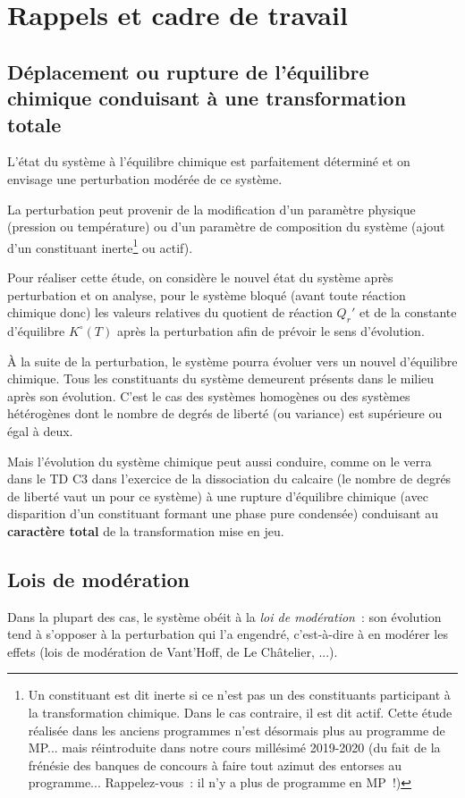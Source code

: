 \documentclass{article}
\begin{document}
\section{Rappels et cadre de travail}
\subsection{Déplacement ou rupture de l’équilibre chimique conduisant à une transformation totale}
L’état du système à l’équilibre chimique est parfaitement déterminé et on envisage une perturbation modérée de ce système.

La perturbation peut provenir de la modification d’un paramètre physique (pression ou température) ou d’un paramètre de composition du système (ajout d’un constituant inerte\footnote{Un constituant est dit inerte si ce n’est pas un des constituants participant à la transformation chimique. Dans le cas contraire, il est dit actif. Cette étude réalisée dans les anciens programmes n’est désormais plus au programme de MP... mais réintroduite dans notre cours millésimé 2019-2020 (du fait de la frénésie des banques de concours à faire tout azimut des entorses au programme... Rappelez-vous~: il n’y a plus de programme en MP~!)} ou actif).

Pour réaliser cette étude, on considère le nouvel état du système après perturbation et on analyse, pour le système bloqué (avant toute réaction chimique donc) les valeurs relatives du quotient de réaction $Q_r'$ et de la constante d’équilibre $K^\circ(T)$ après la perturbation afin de prévoir le sens d’évolution.

À la suite de la perturbation, le système pourra évoluer vers un nouvel d’équilibre chimique. Tous les constituants du système demeurent présents dans le milieu après son évolution. C’est le cas des systèmes homogènes ou des systèmes hétérogènes dont le nombre de degrés de liberté (ou variance) est supérieure ou égal à deux. 

Mais l’évolution du système chimique peut aussi conduire, comme on le verra dans le TD C3 dans l’exercice de la dissociation du calcaire (le nombre de degrés de liberté vaut un pour ce système) à une rupture d’équilibre chimique (avec disparition d’un constituant formant une phase pure condensée) conduisant au \textbf{caractère total} de la transformation mise en jeu.

\subsection{Lois de modération}
\begin{important}
    Dans la plupart des cas, le système obéit à la \textit{loi de modération}~: son évolution tend à s’opposer à la perturbation qui l’a engendré, c’est-à-dire à en modérer les effets (lois de modération de Vant’Hoff, de Le Châtelier, ...).
\end{important}
\end{document}
